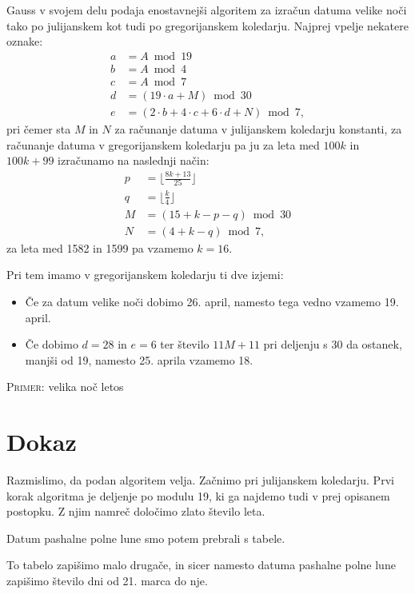 \documentclass[a4paper,12pt]{article}
\begin{document}
Gauss v svojem delu podaja enostavnejši algoritem za izračun datuma velike 
noči tako po julijanskem kot tudi po gregorijanskem koledarju. Najprej vpelje 
nekatere oznake: 
\begin{align*} %
    a &= A \bmod 19 \\
    b &= A \bmod 4 \\
    c &= A \bmod 7 \\
    d &= (19 \cdot a + M) \bmod 30 \\
    e &= (2 \cdot b + 4 \cdot c + 6 \cdot d + N) \bmod 7,
\end{align*}
pri čemer sta $M$ in $N$ za računanje datuma v julijanskem koledarju konstanti, 
za računanje datuma v gregorijanskem koledarju pa ju za leta med $100 k$ in 
$100 k + 99$ izračunamo na naslednji način: 
\begin{align*}
    p &= \lfloor \frac{8k + 13}{25} \rfloor \\
    q &= \lfloor \frac{k}{4} \rfloor \\
    M &= (15 + k - p - q) \bmod 30 \\
    N &= (4 + k - q) \bmod 7,
\end{align*}
za leta med 1582 in 1599 pa vzamemo $k = 16$.

Pri tem imamo v gregorijanskem koledarju ti dve izjemi:
\begin{itemize}
    \item Če za datum velike noči dobimo 26. april, namesto tega vedno vzamemo 
        19. april.
    \item Če dobimo $d = 28$ in $e = 6$ ter število $11M+11$ pri deljenju s 
        30 da ostanek, manjši od 19, namesto 25. aprila vzamemo 18.
\end{itemize}

\textsc{Primer:} velika noč letos

\section*{Dokaz}

Razmislimo, da podan algoritem velja. Začnimo pri julijanskem koledarju. Prvi 
korak algoritma je deljenje po modulu 19, ki ga najdemo tudi v prej opisanem 
postopku. Z njim namreč določimo zlato število leta.

Datum pashalne polne lune smo potem prebrali s tabele.

To tabelo zapišimo malo drugače, in sicer namesto datuma pashalne polne lune 
zapišimo število dni od 21. marca do nje.
\end{document}
